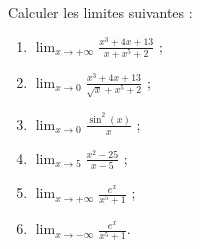 
\begin{exercice}\label{exoExamenDecembre2010-0002}

  Calculer les limites suivantes :
  \begin{enumerate}
  \item $\displaystyle \lim_{x\to +\infty}\frac{x^3+4x+13}{x+x^5+2}$ ;
  \item $\displaystyle \lim_{x\to 0}\frac{x^3+4x+13}{\sqrt{x}+x^5+2}$ ;
  \item $\displaystyle \lim_{x\to 0}\frac{\sin^2(x)}{x}$ ;
  \item $\displaystyle \lim_{x\to 5}\frac{x^2-25}{x-5}$ ;
  \item $\displaystyle \lim_{x\to +\infty}\frac{e^x}{x^5+1}$ ;
  \item $\displaystyle \lim_{x\to -\infty}\frac{e^x}{x^5+1}$.
  \end{enumerate}

\end{exercice}
